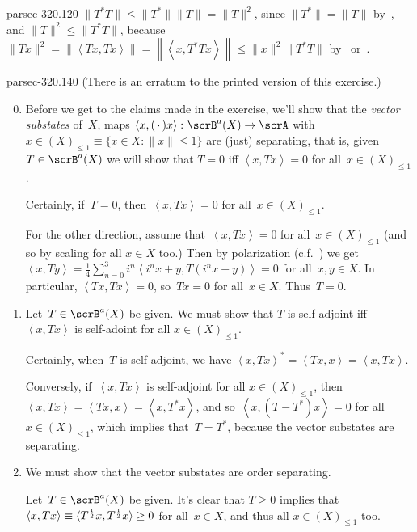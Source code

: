 \documentclass[b5page]{book}
\begin{document}
\begin{solution}{parsec-320.120}%
$\|T^*T\|\leq \|T^*\|\|T\|=\|T\|^2$,
since $\|T^*\|=\|T\|$ by~,
and 
$\|T\|^2 \leq \|T^*T \|$,
because $\|Tx\|^2
=\left\|\left<Tx,Tx\right>\right\|
= \left\|\left<x,T^*Tx\right>\right\|
\leq \|x\|^2 \|T^*T\|$
by~ or~.
\end{solution}
\begin{solution}{parsec-320.140}%
(There is an erratum to the printed version of this exercise.)
\begin{enumerate}
\setcounter{enumi}{-1}
\item
Before we get to the claims
made in the exercise,
we'll show that the \emph{vector substates} of~$X$,
maps $\left<x,(\,\cdot\,)x\right>
\colon \scrB^a(X)\to \scrA$ with~$x\in (X)_{\leq 1}
\equiv
\{x\in X\colon \|x\|\leq 1\}$
are (just) separating,
that is,
given~$T\in \scrB^a(X)$ 
we will show that $T=0$ iff $\left<x,Tx\right>=0$
for all~$x\in (X)_{\leq 1}$.

Certainly, if~$T=0$, then~$\left<x,Tx\right>=0$ for all~$x\in (X)_{\leq 1}$.

For the other direction,
assume that~$\left<x,Tx\right>=0$ for all~$x\in (X)_{\leq 1}$
(and so by scaling for all $x\in X$ too.)
Then by polarization (c.f.~)
we get
$\left<x,Ty\right>
= \frac{1}{4}\sum_{n=0}^3 i^n \left<i^nx+y,T(i^nx+y)\right>=0$
for all~$x,y\in X$.
In particular, 
$\left<Tx,Tx\right>=0$, so~$Tx=0$ for all~$x\in X$.
Thus~$T=0$.

\item
Let~$T\in\scrB^a(X)$ be given.
We must show that $T$ is self-adjoint
iff $\left<x,Tx\right>$ is self-adoint for all
$x\in (X)_{\leq 1}$.

Certainly, when~$T$ is self-adjoint,
we have $\left<x,Tx\right>^*
= \left<Tx,x\right>=\left<x,Tx\right>$.

Conversely, if~$\left<x,Tx\right>$ is self-adjoint for all
$x\in (X)_{\leq 1}$,
then $\left<x,Tx\right>=\left<Tx,x\right>
=\left<x,T^*x\right>$,
and so~$\left<x,(T-T^*)x\right>=0$
for all~$x\in (X)_{\leq 1}$,
which implies that~$T=T^*$,
because the vector substates are separating.

\item
We must show that the vector substates are order
separating.

Let~$T\in \scrB^a(X)$ be given.
It's clear that $T\geq 0$ 
implies that
$\left<x,Tx\right>\equiv \left<\smash{T^{\frac{1}{2}}x,
T^{\frac{1}{2}}x}\right> \geq 0$
for all~$x\in X$, and thus all $x\in (X)_{\leq 1}$ too.


\end{enumerate}
\end{solution}
\end{document}
